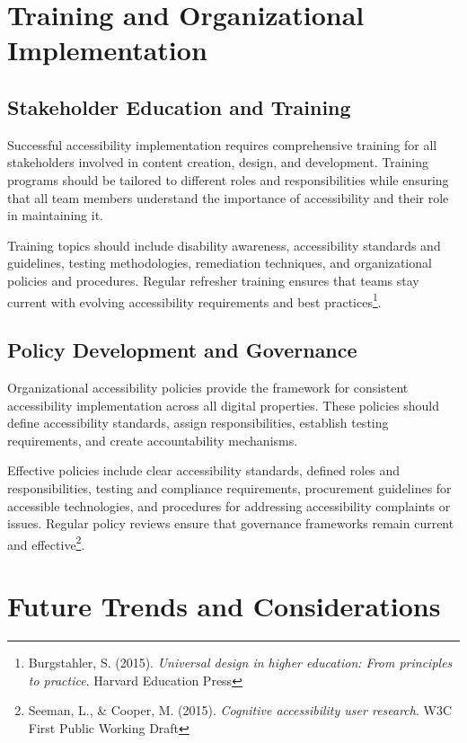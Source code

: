 \section{Training and Organizational Implementation}\label{sec:training-org}

\subsection{Stakeholder Education and Training}

Successful accessibility implementation requires comprehensive training for all stakeholders involved in content creation, design, and development. Training programs should be tailored to different roles and responsibilities while ensuring that all team members understand the importance of accessibility and their role in maintaining it.

Training topics should include disability awareness, accessibility standards and guidelines, testing methodologies, remediation techniques, and organizational policies and procedures. Regular refresher training ensures that teams stay current with evolving accessibility requirements and best practices\footnote{Burgstahler, S. (2015). \textit{Universal design in higher education: From principles to practice}. Harvard Education Press}.

\subsection{Policy Development and Governance}

Organizational accessibility policies provide the framework for consistent accessibility implementation across all digital properties. These policies should define accessibility standards, assign responsibilities, establish testing requirements, and create accountability mechanisms.

Effective policies include clear accessibility standards, defined roles and responsibilities, testing and compliance requirements, procurement guidelines for accessible technologies, and procedures for addressing accessibility complaints or issues. Regular policy reviews ensure that governance frameworks remain current and effective\footnote{Seeman, L., \& Cooper, M. (2015). \textit{Cognitive accessibility user research}. W3C First Public Working Draft}.

\section{Future Trends and Considerations}\label{sec:future-trends}

